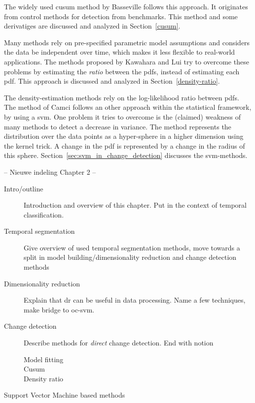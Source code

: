 The widely used \gls{cusum} method by Basseville \etal \cite{basseville1993detection} follows this approach.
It originates from control methods for detection from benchmarks.
This method and some derivatiges are discussed and analyzed in Section~\ref{cusum}.

Many methods rely on pre-specified parametric model assumptions and considers the data be independent over time, which makes it less flexible to real-world applications.
The methods proposed by Kawahara \etal \cite{kawahara2009change} and Lui \etal \cite{liu2013change} try to overcome these problems by estimating the \emph{ratio} between the \glspl{pdf}, instead of estimating each \gls{pdf}.
This approach is discussed and analyzed in Section~\ref{density-ratio}.

The density-estimation methods rely on the log-likelihood ratio between \glspl{pdf}.
The method of Camci \cite{camci2010change} follows an other approach within the statistical framework, by using a \gls{svm}.
One problem it tries to overcome is the (claimed) weakness of many methods to detect a decrease in variance.
The method represents the distribution over the data points as a hyper-sphere in a higher dimension using the kernel trick.
A change in the \gls{pdf} is represented by a change in the radius of this sphere.
Section~\ref{sec:svm_in_change_detection} discusses the \gls{svm}-methods.


-- Nieuwe indeling Chapter 2 --

\begin{description}
  \item[Intro/outline] Introduction and overview of this chapter. Put in the context of temporal classification.
  \item[Temporal segmentation] Give overview of used temporal segmentation methods, move towards a split in model building/dimensionality reduction and change detection methods
  \item[Dimensionality reduction] Explain that \gls{dr} can be useful in data processing. Name a few techniques, make bridge to \gls{oc-svm}.
  \item[Change detection] Describe methods for \emph{direct} change detection. End with notion
    \begin{description}
      \item[Model fitting]
      \item[Cusum]
      \item[Density ratio]
    \end{description}
  \item[Support Vector Machine based methods]

\end{description}

